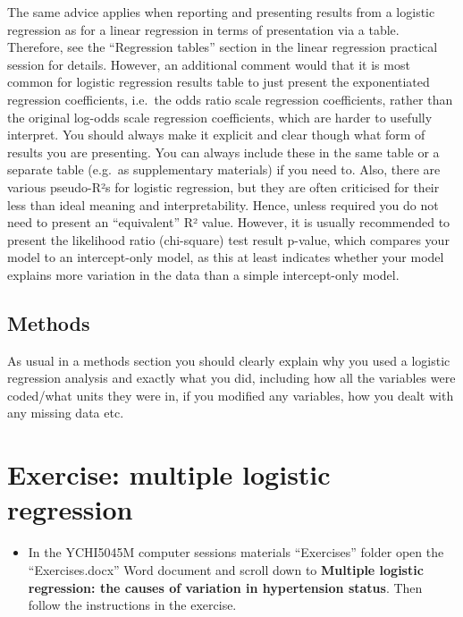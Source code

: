 \documentclass[
]{book}
\providecommand{\tightlist}{%
  \setlength{\itemsep}{0pt}\setlength{\parskip}{0pt}}
\begin{document}
The same advice applies when reporting and presenting results from a logistic regression as for a linear regression in terms of presentation via a table. Therefore, see the ``Regression tables'' section in the linear regression practical session for details. However, an additional comment would that it is most common for logistic regression results table to just present the exponentiated regression coefficients, i.e.~the odds ratio scale regression coefficients, rather than the original log-odds scale regression coefficients, which are harder to usefully interpret. You should always make it explicit and clear though what form of results you are presenting. You can always include these in the same table or a separate table (e.g.~as supplementary materials) if you need to. Also, there are various pseudo-R²s for logistic regression, but they are often criticised for their less than ideal meaning and interpretability. Hence, unless required you do not need to present an ``equivalent'' R² value. However, it is usually recommended to present the likelihood ratio (chi-square) test result p-value, which compares your model to an intercept-only model, as this at least indicates whether your model explains more variation in the data than a simple intercept-only model.

\hypertarget{methods-1}{%
\subsection{Methods}\label{methods-1}}

As usual in a methods section you should clearly explain why you used a logistic regression analysis and exactly what you did, including how all the variables were coded/what units they were in, if you modified any variables, how you dealt with any missing data etc.

\hypertarget{exercise-multiple-logistic-regression}{%
\section{Exercise: multiple logistic regression}\label{exercise-multiple-logistic-regression}}

\begin{itemize}
\tightlist
\item
  In the YCHI5045M computer sessions materials ``Exercises'' folder open the ``Exercises.docx'' Word document and scroll down to \textbf{Multiple logistic regression: the causes of variation in hypertension status}. Then follow the instructions in the exercise.
\end{itemize}
\end{document}
